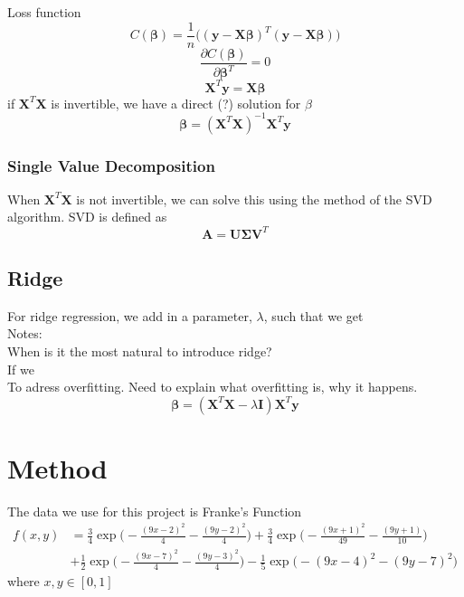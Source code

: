 \documentclass{article}
\begin{document}
Loss function
\begin{equation*}
    C(\mathbf{\beta}) = \frac{1}{n}\Big((\mathbf{y} - \mathbf{X\beta})^T(\mathbf{y} - \mathbf{X\beta})\Big)
\end{equation*}
\begin{equation*}
    \frac{\partial C(\mathbf{\beta})}{\partial \mathbf{\beta}^T} = 0
\end{equation*}
\begin{equation*}
    \mathbf{X}^T\mathbf{y} = \mathbf{X\beta}
\end{equation*}
if $\mathbf{X}^T\mathbf{X}$ is invertible, we have a direct (?) solution for $\beta$
\begin{equation*}
    \mathbf{\beta} = (\mathbf{X}^T\mathbf{X})^{-1}\mathbf{X}^T\mathbf{y}
\end{equation*}

\subsubsection{Single Value Decomposition}
When $\mathbf{X}^T\mathbf{X}$ is not invertible, we can solve this using the method of the SVD algorithm. SVD is defined as
\begin{equation*}
    \mathbf{A} = \mathbf{U}\mathbf{\Sigma}\mathbf{V}^T
\end{equation*}
\subsection{Ridge}
For ridge regression, we add in a parameter, $\lambda$, such that we get 
\\ 
Notes: 
\\
 When is it the most natural to introduce ridge? 
\\
If we 
\\
To adress overfitting. Need to explain what overfitting is, why it happens. 
\begin{equation*}
    \mathbf{\beta} = (\mathbf{X}^T\mathbf{X} - \lambda\mathbf{I})\mathbf{X}^T\mathbf{y}
\end{equation*}
\section{Method}
The data we use for this project is Franke's Function
\begin{equation*}
    \begin{split}
        f(x,y) & = \frac{3}{4}\exp\Bigg(-\frac{(9x-2)^2}{4} - \frac{(9y-2)^2}{4}\Bigg) + \frac{3}{4}\exp\Bigg(-\frac{(9x+1)^2}{49} - \frac{(9y+1)}{10}\Bigg) \\
        & + \frac{1}{2}\exp\Bigg(-\frac{(9x-7)^2}{4} - \frac{(9y-3)^2}{4}\Bigg) - \frac{1}{5}\exp\Bigg(-(9x-4)^2 - (9y-7)^2\Bigg)
    \end{split}
\end{equation*}
where $x,y \in [0,1]$
\end{document}

